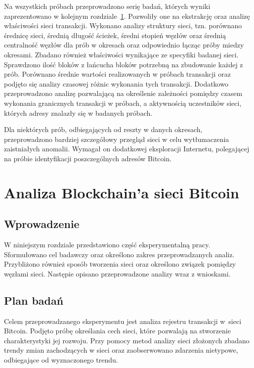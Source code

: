 \documentclass[12pt, oneside, final, openany]{mgr}
\begin{document}
\indent Na wszystkich próbach przeprowadzono serię badań, których wyniki zaprezentowano w kolejnym rozdziale~\ref{analizaBlockchain}. Pozwoliły one na ekstrakcję oraz analizę właściwości sieci transakcji. Wykonano analizy struktury sieci, tzn. porównano średnicę sieci, średnią długość ścieżek, średni stopień węzłów oraz średnią centralność węzłów dla prób w okresach oraz odpowiednio łącząc próby miedzy okresami. Zbadano również właściwości wynikające ze specyfiki badanej sieci. Sprawdzono ilość bloków z łańcucha bloków potrzebną na zbudowanie każdej z prób. Porównano średnie wartości realizowanych w próbach transakcji  oraz podjęto się analizy czasowej różnic wykonania tych transakcji. Dodatkowo przeprowadzono analizę pozwalającą na określenie zależności pomiędzy czasem wykonania granicznych transakcji w próbach, a aktywnością uczestników sieci, których adresy znalazły się w badanych próbach.

\indent Dla niektórych prób, odbiegających od reszty w danych okresach, przeprowadzono bardziej szczegółowy przegląd sieci w celu wytłumaczenia zaistniałych anomalii. Wymagał on dodatkowej eksploracji Internetu, polegającej na próbie identyfikacji poszczególnych adresów Bitcoin.


\chapter{Analiza Blockchain'a sieci Bitcoin}
\label{analizaBlockchain}
\section{Wprowadzenie}

\indent W niniejszym rozdziale przedstawiono część eksperymentalną pracy. Sformułowano cel badawczy oraz określono zakres przeprowadzanych analiz. Przybliżono również sposób tworzenia sieci oraz określono związek pomiędzy węzłami sieci. Następie opisano przeprowadzone analizy wraz z wnioskami.

\section{Plan badań}

\indent Celem przeprowadzanego eksperymentu jest analiza rejestru transakcji w~sieci Bitcoin. Podjęto próbę określania cech sieci, które pozwalają na stworzenie charakterystyki jej rozwoju. Przy pomocy metod analizy sieci złożonych zbadano trendy zmian zachodzących w sieci oraz zaobserwowano zdarzenia nietypowe, odbiegające od wyznaczonego trendu. 
\end{document}

